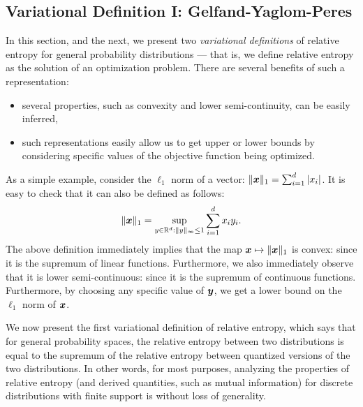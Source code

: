         \subsection{Variational Definition I: Gelfand-Yaglom-Peres} 
        \label{subsec:var-def-I-gelfand} 
            In this section, and the next, we present two \emph{variational definitions} of relative entropy for general probability distributions --- that is, we define relative entropy as the solution of an optimization problem. There are several benefits of such a representation: 
            \begin{itemize}
                \item several properties, such as convexity and lower semi-continuity, can be easily inferred, 
                \item such representations easily allow us to get upper or lower bounds by considering specific values of the objective function being optimized. 
            \end{itemize}

            \begin{example}
                \label{example:l1-norm}
                 As a simple example, consider the $\ell_1$ norm of a vector: $\|\boldsymbol{x}\|_1 = \sum_{i=1}^d |x_i|$. It is easy to check that it can also be defined as follows: 
                \begin{align}
                    \|\boldsymbol{x}\|_1 = \sup_{y \in \mathbb{R}^d: \|y\|_\infty \leq 1} \sum_{i=1}^d x_i y_i. 
                \end{align}
                The above definition immediately implies that the map $\boldsymbol{x} \mapsto \|\boldsymbol{x}\|_1$ is convex: since it is the supremum of linear functions. Furthermore, we also immediately observe that it is lower semi-continuous: since it is the supremum of continuous functions. Furthermore, by choosing any specific value of $\boldsymbol{y}$, we get a lower bound on the $\ell_1$ norm of $\boldsymbol{x}$.             
            \end{example}

            We now present the first variational definition of relative entropy, which says that for general probability spaces, the relative entropy between two distributions is equal to the supremum of the relative entropy between quantized versions of the two distributions. In other words, for most purposes, analyzing the properties of relative entropy (and derived quantities, such as mutual information) for discrete distributions with finite support is without loss of generality. 
        
